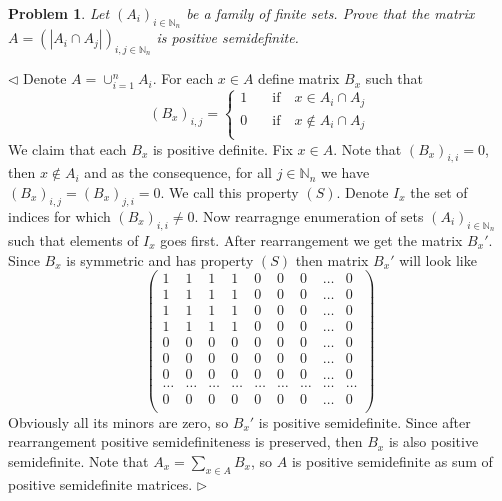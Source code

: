 \documentclass[12pt]{article}
\newtheorem{problem}{Problem}[subsection]
\newenvironment{solution}{\par $\triangleleft$}{$\triangleright$}
\begin{document}
\begin{problem} Let $(A_i)_{i\in\mathbb{N}_n}$ be a family of finite sets. Prove that the matrix $A=(|A_i\cap A_j|)_{i,j\in\mathbb{N}_n}$ is positive semidefinite.
\end{problem}
\begin{solution} Denote $A=\cup_{i=1}^n A_i$. For each $x\in A$ define matrix $B_x$ such that
$$
(B_x)_{i,j}=
\begin{cases}
1&\quad\mbox{if}\quad x\in A_i\cap A_j\\
0&\quad\mbox{if}\quad x\notin A_i\cap A_j\\
\end{cases}
$$
We claim that each $B_x$ is positive definite. Fix $x\in A$. Note that $(B_x)_{i,i}=0$, then $x\notin A_i$ and as the consequence, for all $j\in\mathbb{N}_n$ we have $(B_x)_{i,j}=(B_x)_{j,i}=0$. We call this property $(S)$.  Denote $I_x$ the set of indices for which $(B_x)_{i,i}\neq 0$. Now rearragnge enumeration of sets $(A_i)_{i\in\mathbb{N}_n}$ such that elements of $I_x$ goes first. After rearrangement we get the matrix $B_x'$. Since $B_x$ is symmetric and has property $(S)$ then matrix $B_x'$ will look like
$$
\begin{pmatrix}
1      & 1      & 1      & 1      & 0      & 0      & 0      & \ldots & 0      \\
1      & 1      & 1      & 1      & 0      & 0      & 0      & \ldots & 0      \\
1      & 1      & 1      & 1      & 0      & 0      & 0      & \ldots & 0      \\
1      & 1      & 1      & 1      & 0      & 0      & 0      & \ldots & 0      \\
0      & 0      & 0      & 0      & 0      & 0      & 0      & \ldots & 0      \\
0      & 0      & 0      & 0      & 0      & 0      & 0      & \ldots & 0      \\
0      & 0      & 0      & 0      & 0      & 0      & 0      & \ldots & 0      \\
\hdots & \hdots & \hdots & \hdots & \hdots & \hdots & \hdots & \hdots & \hdots \\
0      & 0      & 0      & 0      & 0      & 0      & 0      & \ldots & 0      \\
\end{pmatrix}
$$
Obviously all its minors are zero, so $B_x'$ is positive semidefinite. Since after rearrangement positive semidefiniteness is preserved, then $B_x$ is also positive semidefinite. Note that $A_x=\sum_{x\in A} B_x$, so $A$ is positive semidefinite as sum of positive semidefinite matrices.
\end{solution}
 
\end{document}

